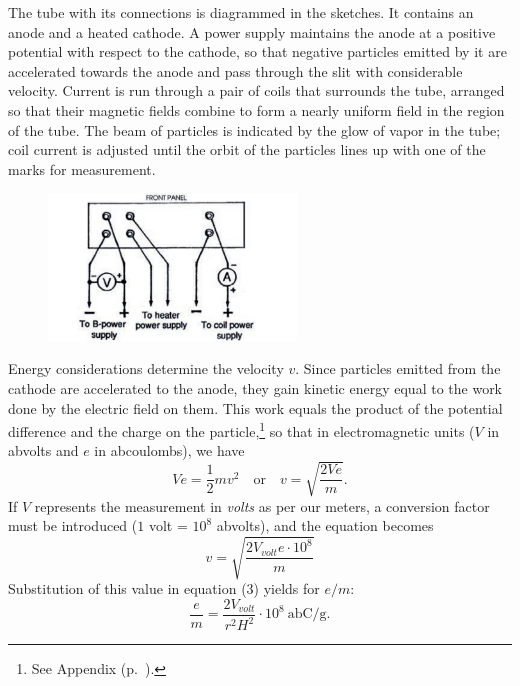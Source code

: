 The tube with its connections is diagrammed in the sketches. It contains
an anode and a heated cathode. A power supply maintains the anode at a positive
potential with respect to the cathode, so that negative particles emitted
by it are accelerated towards the anode and pass through the slit with
considerable velocity. Current is run through a pair of coils that surrounds the tube, arranged so that 
their magnetic fields combine to form a nearly uniform field in the region of the tube. The beam of 
particles is indicated by the glow of vapor in the tube; coil current is adjusted until 
the orbit of the particles lines up with one of the marks for measurement.

\begin{figure}[h]
  \begin{center}
    \includegraphics[width=2.59in,height=1.53667in]{images/02_thomson/power-supply.png}
  \end{center}
\end{figure}



Energy considerations determine the velocity $v$. Since particles
emitted from the cathode are accelerated to the anode, they gain kinetic
energy equal to the work done by the electric field on them. This work
equals the product of the potential difference and the charge on the
particle,\footnote{See Appendix (p.~\pageref{ch:appendix}).} so that in electromagnetic
units ($V$ in abvolts and $e$ in abcoulombs), we have
%
\begin{equation}
Ve = \frac{1}{2}mv^2 \quad\text{or}\quad v = \sqrt{\frac{2Ve}{m}}.\label{eq:thomson_4}
\end{equation}
%
If $V$ represents the measurement in \emph{volts} as per our
meters, a conversion factor must be introduced ($1$ volt = $10^8$ abvolts),
and the equation becomes
\begin{equation}
v = \sqrt{\frac{2V_{volt}e\cdot{10^8}}{m}}\label{eq:thomson_5}
\end{equation}
Substitution of this value in equation (3) yields for $e/m$:
\begin{equation}
\frac{e}{m} = \frac{2V_{volt}}{r^2H^2}\cdot 10^8 \:\text{abC/g.}\label{eq:thomson_6}
\end{equation}

